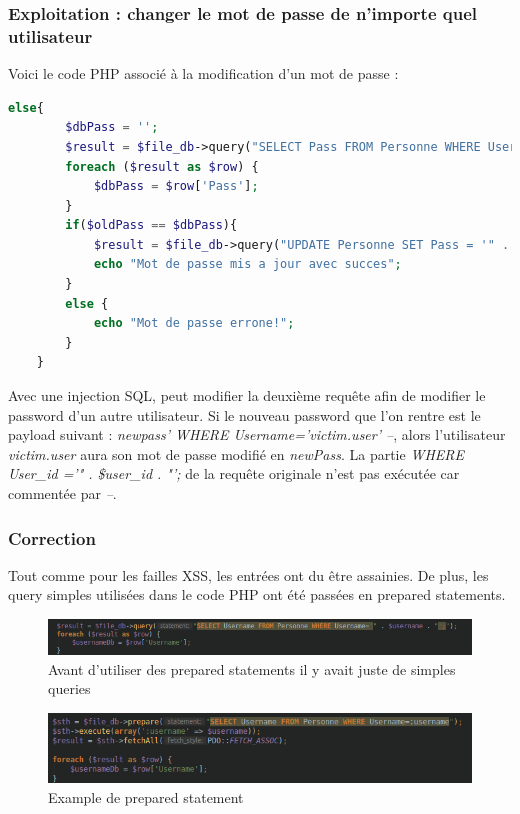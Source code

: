 \documentclass[12pt]{article}
\begin{document}
\subsubsection{Exploitation : changer le mot de passe de n'importe quel utilisateur}
Voici le code PHP associé à la modification d'un mot de passe : 
\begin{lstlisting}[language=PHP]
    else{
        $dbPass = '';
        $result = $file_db->query("SELECT Pass FROM Personne WHERE User_id ='" . $user_id . "';");
        foreach ($result as $row) {
            $dbPass = $row['Pass'];
        }
        if($oldPass == $dbPass){
            $result = $file_db->query("UPDATE Personne SET Pass = '" . $newPass . "' WHERE User_id ='" . $user_id . "';");
            echo "Mot de passe mis a jour avec succes";
        }
        else {
            echo "Mot de passe errone!";
        }
    }
\end{lstlisting}

Avec une injection SQL, peut modifier la deuxième requête afin de modifier le password d'un autre utilisateur. Si le nouveau password que l'on rentre est le payload suivant : \textit{newpass' WHERE Username='victim.user' --}, alors l'utilisateur \textit{victim.user} aura son mot de passe modifié en \textit{newPass}. La partie \textit{WHERE User\_id ='" . \$user\_id . "';} de la requête originale n'est pas exécutée car commentée par \textit{--}.

\subsubsection{Correction}
Tout comme pour les failles XSS, les entrées ont du être assainies. De plus, les query simples utilisées dans le code PHP ont été passées en prepared statements.

\begin{figure}[H]
\centering
\includegraphics[width=\linewidth]{images/simpleQuery.png}
\caption{Avant d'utiliser des prepared statements il y avait juste de simples queries}
\end{figure}

\begin{figure}[H]
\centering
\includegraphics[width=\linewidth]{images/preparedStatement.png}
\caption{Example de prepared statement}
\end{figure}
\end{document}
